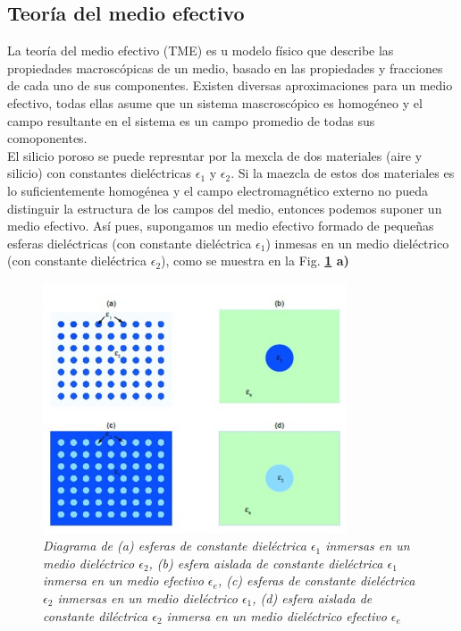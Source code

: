 \documentclass[a4paper,11pt,]{book}
\begin{document}
\subsection{Teoría del medio efectivo}
La teoría del medio efectivo (TME) es u modelo físico que describe las propiedades macroscópicas de un medio, basado en las propiedades y fracciones de cada uno de sus componentes. Existen diversas aproximaciones para un medio efectivo, todas ellas asume que un sistema mascroscópico es homogéneo y el campo resultante en el sistema es un campo promedio de todas sus comoponentes.\\
El silicio poroso se puede represntar por la mexcla de dos materiales (aire y silicio) con constantes dieléctricas $\epsilon_1$ y $\epsilon_2$. Si la maezcla de estos dos materiales es lo suficientemente homogénea y el campo electromagnético externo no pueda distinguir la estructura de los campos del medio, entonces podemos suponer un medio efectivo. Así pues, supongamos un medio efectivo formado de pequeñas esferas dieléctricas (con constante dieléctrica $\epsilon_1$) inmesas en un medio dieléctrico (con constante dieléctrica $\epsilon_2$), como se muestra en la Fig. \textbf{\ref{fig:ME} a)}

\begin{figure}[H]
	\centering
	\includegraphics[width=9cm]{../Images/medio}
	\caption{\emph{Diagrama de (a) esferas de constante dieléctrica $\epsilon_1$ inmersas en un medio dieléctrico $\epsilon_2$, (b) esfera aislada de constante dieléctrica $\epsilon_1$ inmersa en un medio efectivo $\epsilon_e$, (c) esferas de constante dieléctrica $\epsilon_2$ inmersas en un medio dieléctrico $\epsilon_1$, (d) esfera aislada de constante diléctrica $\epsilon_2$ inmersa en un medio dieléctrico efectivo $\epsilon_e$}}
	\label{fig:ME}
\end{figure}
\end{document}
